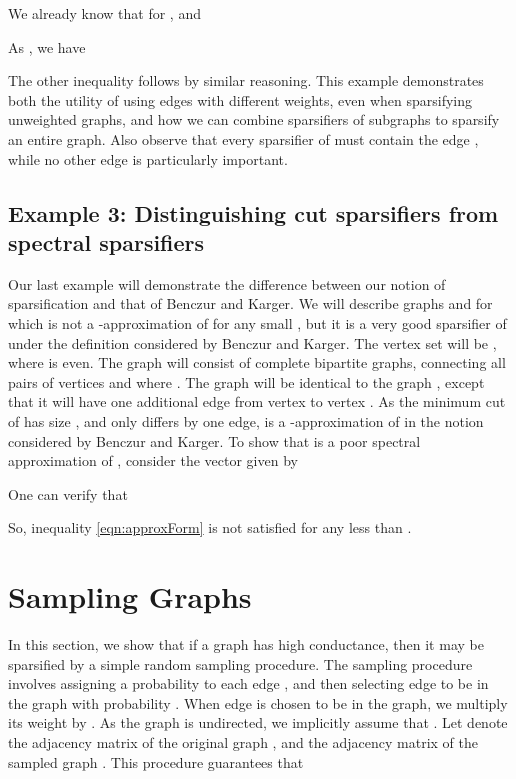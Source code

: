 \documentclass[11pt]{article}
\begin{document}
We already know that for
,
and  

As , we have

The other inequality follows by similar reasoning.
This example demonstrates both the utility of using edges with different weights, even
  when sparsifying unweighted graphs, and how we can combine sparsifiers
  of subgraphs to sparsify an entire graph.
Also observe that every sparsifier of  must contain the edge , while no other
  edge is particularly important.


\subsection{Example 3: Distinguishing cut sparsifiers from spectral sparsifiers}


\begin{figure}[h]
\centering
{} \quad
{}
\end{figure}



Our last example will demonstrate the difference between our notion of sparsification
  and that of Benczur and Karger.
We will describe graphs  and  for which  is not a -approximation of  for any small
  , but it is a very good sparsifier of 
  under the definition considered by Benczur and Karger.
The vertex set  will be , where  is even.
The graph  will consist of  complete bipartite graphs, connecting all pairs of
  vertices  and  where .
The graph  will be identical to the graph , except that it will have one additional
  edge  from vertex  to vertex .
As the minimum cut of  has size , and  only differs by one edge,
   is a -approximation of  in the notion considered by Benczur and Karger.
To show that  is a poor spectral approximation of , consider the vector 
  given by

One can verify that

So,  inequality \eqref{eqn:approxForm}
  is not satisfied for any  less than .


\section{Sampling Graphs}\label{sec:sampling}
In this section, we show that if a graph has high conductance,
  then it may be sparsified by a simple random sampling procedure.
The sampling procedure involves assigning a probability
   to each edge , and then selecting edge  to be
  in the graph  with probability .
When edge  is chosen to be in the graph, we multiply its weight by
  .
As the graph is undirected, we implicitly assume that .
Let  denote the adjacency matrix of the original graph , and 
  the adjacency matrix of the sampled graph .
This procedure guarantees that
\end{document}
